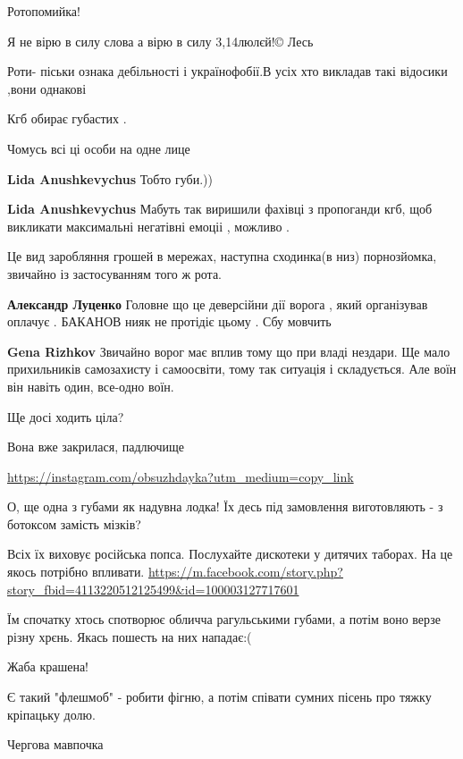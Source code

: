 \begin{itemize}
Ротопомийка!

Я не вірю в силу слова а вірю в силу 3,14люлєй!© Лесь

Роти- піськи ознака дебільності і українофобії.В усіх хто викладав такі відосики ,вони однакові

Кгб обирає губастих .

Чомусь всі ці особи на одне лице

\begin{itemize} %
\textbf{Lida Anushkevychus} Тобто губи.))

\textbf{Lida Anushkevychus} Мабуть так виришили фахівці з пропоганди кгб, щоб викликати максимальні негатівні емоціі , можливо .
\end{itemize} %

Це вид заробляння грошей в мережах, наступна сходинка(в низ)
порнозйомка, звичайно із застосуванням того ж рота.

\begin{itemize} %
\textbf{Александр Луценко} Головне що це деверсійни дії ворога , який організував оплачує . БАКАНОВ нияк не протідіє цьому . Сбу мовчить

\textbf{Gena Rizhkov} Звичайно ворог має вплив тому що при владі нездари. Ще
мало прихильників самозахисту і самоосвіти, тому так ситуація і складується. Але
воїн він навіть один, все-одно воїн.
\end{itemize} %

Ще досі ходить ціла?

Вона вже закрилася, падлючище

\url{https://instagram.com/obsuzhdayka?utm_medium=copy_link}

О, ще одна з губами як надувна лодка! Їх десь під замовлення виготовляють - з ботоксом замість мізків?


Всіх їх виховує російська попса. Послухайте дискотеки у дитячих таборах. На це якось потрібно впливати.
\url{https://m.facebook.com/story.php?story_fbid=4113220512125499&id=100003127717601}

Їм спочатку хтось спотворює обличча рагульськими губами, а потім воно верзе різну хрєнь. Якась пошесть на них нападає:(

Жаба крашена!

Є такий "флешмоб" - робити фігню, а потім співати сумних пісень про тяжку кріпацьку долю.


Чергова мавпочка

\end{itemize} %
